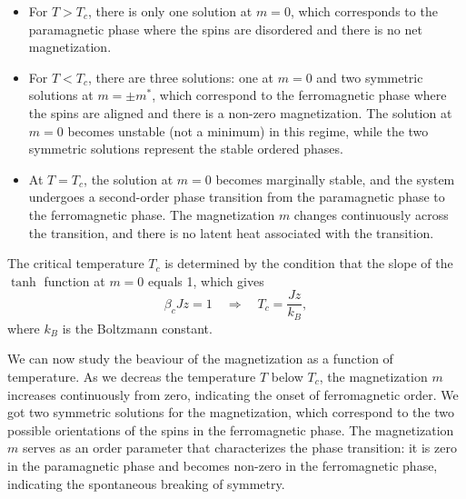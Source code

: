 \begin{itemize}
    \item For \(T > T_c\), there is only one solution at \(m = 0\), which corresponds to the paramagnetic phase where the spins are disordered and there is no net magnetization.
    \item For \(T < T_c\), there are three solutions: one at \(m = 0\) and two symmetric solutions at \(m = \pm m^*\), which correspond to the ferromagnetic phase where the spins are aligned and there is a non-zero magnetization. The solution at \(m = 0\) becomes unstable (not a minimum) in this regime, while the two symmetric solutions represent the stable ordered phases.
    \item At \(T = T_c\), the solution at \(m = 0\) becomes marginally stable, and the system undergoes a second-order phase transition from the paramagnetic phase to the ferromagnetic phase. The magnetization \(m\) changes continuously across the transition, and there is no latent heat associated with the transition.
\end{itemize}
The critical temperature \(T_c\) is determined by the condition that the slope of the \(\tanh\) function at \(m = 0\) equals 1, which gives
\[
    \beta_c J z = 1 \quad \Rightarrow \quad T_c = \frac{J z}{k_B},
\]
where \(k_B\) is the Boltzmann constant.

We can now study the beaviour of the magnetization as a function of temperature.
As we decreas the temperature \(T\) below \(T_c\), the magnetization \(m\) increases continuously from zero, indicating the onset of ferromagnetic order. We got two symmetric solutions for the magnetization, which correspond to the two possible orientations of the spins in the ferromagnetic phase. The magnetization \(m\) serves as an order parameter that characterizes the phase transition: it is zero in the paramagnetic phase and becomes non-zero in the ferromagnetic phase, indicating the spontaneous breaking of symmetry.


